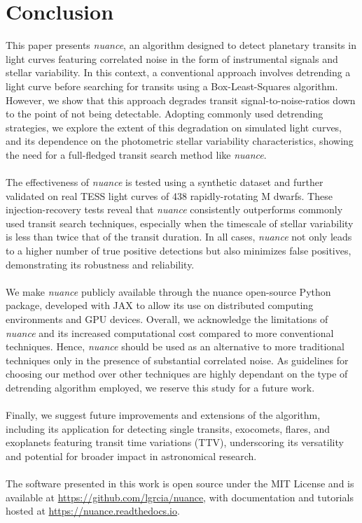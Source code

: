 \documentclass[modern,linenumbers]{aastex631}
\newcommand{\nuancemethod}{\textit{nuance}}
\newcommand{\nuancecode}{\textsf{nuance}}
\begin{document}
\newpage
\section{Conclusion}\label{conclusion}
This paper presents \nuancemethod{}, an algorithm designed to detect planetary transits in light curves featuring correlated noise in the form of instrumental signals and stellar variability. In this context, a conventional approach involves detrending a light curve before searching for transits using a Box-Least-Squares algorithm. However, we show that this approach degrades transit signal-to-noise-ratios down to the point of not being detectable. Adopting commonly used detrending strategies, we explore the extent of this degradation on simulated light curves, and its dependence on the photometric stellar variability characteristics, showing the need for a full-fledged transit search method like \nuancemethod{}.\\\\
The effectiveness of \nuancemethod{} is tested using a synthetic dataset and further validated on real TESS light curves of 438 rapidly-rotating M dwarfs. These injection-recovery tests reveal that \nuancemethod{} consistently outperforms commonly used transit search techniques, especially when the timescale of stellar variability is less than twice that of the transit duration. In all cases, \nuancemethod{} not only leads to a higher number of true positive detections but also minimizes false positives, demonstrating its robustness and reliability.\\\\
We make \nuancemethod{} publicly available through the \nuancecode{} open-source Python package, developed with \textsf{JAX} to allow its  use on distributed computing environments and GPU devices. Overall, we acknowledge the limitations of \nuancemethod{} and its increased computational cost compared to more conventional techniques. Hence, \nuancemethod{} should be used as an alternative to more traditional techniques only in the presence of substantial correlated noise. As guidelines for choosing our method over other techniques are highly dependant on the type of detrending algorithm employed, we reserve this study for a future work.\\\\
Finally, we suggest future improvements and extensions of the algorithm, including its application for detecting single transits, exocomets, flares, and exoplanets featuring transit time variations (TTV), underscoring its versatility and potential for broader impact in astronomical research.
\\\\
The software presented in this work is open source under the MIT License and is
available at \href{https://github.com/lgrcia/nuance}{https://github.com/lgrcia/nuance}, with documentation and tutorials hosted at \href{https://nuance.readthedocs.io}{https://nuance.readthedocs.io}. 
\end{document}

